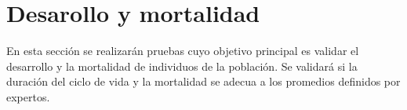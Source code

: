 \section{Desarollo y mortalidad}
En esta sección se realizarán pruebas cuyo objetivo principal es validar el desarrollo y la mortalidad de
individuos de la población. Se validará si la duración del ciclo de vida y la mortalidad se adecua a los
promedios definidos por expertos.






